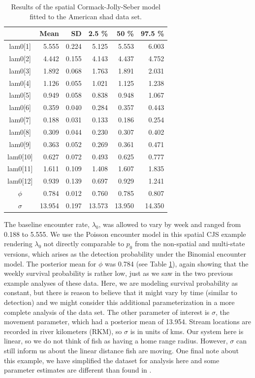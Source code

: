 \begin{table}
\centering
\caption{
Results of the spatial Cormack-Jolly-Seber model fitted to the 
American shad data set.
}
\begin{tabular}{crrrrr}
\hline \hline
&       Mean   &  SD  &  2.5 \%   &   50 \%    &  97.5 \% \\
\hline
lam0[1] &  5.555& 0.224  & 5.125 & 5.553 	& 6.003 \\
lam0[2] &  4.442& 0.155  & 4.143 & 4.437  & 4.752 \\
lam0[3] &  1.892& 0.068  & 1.763 & 1.891  & 2.031 \\
lam0[4] &  1.126& 0.055  & 1.021 & 1.125  & 1.238 \\
lam0[5] &  0.949& 0.058  & 0.838 & 0.948 & 1.067 \\
lam0[6] &  0.359& 0.040  & 0.284 & 0.357 & 0.443 \\
lam0[7] &  0.188& 0.031  & 0.133 & 0.186 &  0.254 \\
lam0[8] &  0.309 &0.044  & 0.230  & 0.307  & 0.402 \\
lam0[9]  & 0.363 &0.052 &  0.269 &  0.361 & 0.471 \\
lam0[10] & 0.627 &0.072  & 0.493  & 0.625  & 0.777 \\
lam0[11] & 1.611 &0.109  & 1.408  & 1.607  & 1.835 \\
lam0[12] & 0.939 &0.139 & 0.697  & 0.929  & 1.241 \\
$\phi$  &  0.784 &0.012  & 0.760  & 0.785  & 0.807 \\
$\sigma$ & 13.954& 0.197  & 13.573 & 13.950  & 14.350\\
\hline
\end{tabular}
\label{open.tab.shad1}
\end{table}

The baseline encounter rate, $\lambda_0$, was allowed to vary by week
and ranged from 0.188 to 5.555.  We use the Poisson encounter model in
this spatial CJS example rendering $\lambda_0$ not directly comparable
to $p_0$ from the non-spatial and multi-state versions, which arises as
the detection probability under the Binomial encounter model.
The posterior mean for $\phi$ was
0.784 (see Table \ref{open.tab.shad1}), again showing that the weekly
survival probability is rather low, just as we saw in the two
previous example analyses of these data.  Here, we are modeling
survival probability as constant, but there is reason to believe that
it might vary by time (similar to detection) and we might consider
this additional parameterization in a more complete analysis of the
data set. The other parameter of interest is $\sigma$, the movement
parameter, which had a posterior mean of 13.954.  Stream locations are 
recorded in river kilometers (RKM), so $\sigma$ is in units of kms.
Our system here is
linear, so we do not think of fish as having a home range radius.
  However, $\sigma$ can still inform us about the linear
distance fish are moving.  One final note about this example, we have
simplified the dataset for analysis here and some parameter estimates
are different than found in \citet{raabe_diss:2012}.


